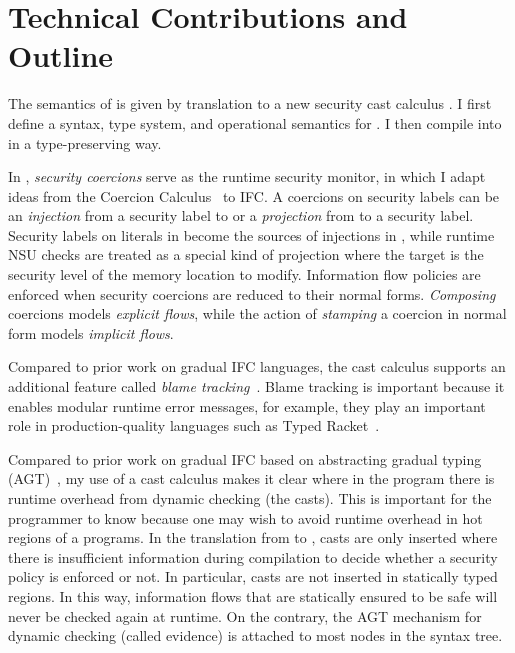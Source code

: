 \section{Technical Contributions and Outline}

The semantics of \Surface is given by translation to a new security cast
calculus \CC. I first define a syntax, type system, and operational semantics
for \CC. I then compile \Surface into \CC in a type-preserving way.

In \CC, \textit{security coercions} serve as the runtime security monitor, in
which I adapt ideas from the Coercion
Calculus~\parencite{Henglein:1994nz,Herman:2010aa} to IFC. A coercions on
security labels can be an \textit{injection} from a security label to \unk or a
\textit{projection} from \unk to a security label. Security labels on literals
in \Surface become the sources of injections in \CC, while runtime NSU checks
are treated as a special kind of projection where the target is the security
level of the memory location to modify. Information flow policies are enforced
when security coercions are reduced to their normal forms. \textit{Composing}
coercions models \textit{explicit flows}, while the action of \textit{stamping}
a coercion in normal form models \textit{implicit flows}.

Compared to prior work on gradual IFC languages, the \CC cast calculus supports
an additional feature called \textit{blame tracking}~\parencite{Findler:2002eu}.
Blame tracking is important because it enables modular runtime error messages,
for example, they play an important role in production-quality languages such as
Typed Racket~\parencite{Tobin-Hochstadt:2008lr,Preston-Tunnell-Wilson:2018aa}.

Compared to prior work on gradual IFC based on abstracting gradual typing
(AGT)~\parencite{Toro:2018aa}, my use of a cast calculus makes it clear where
in the program there is runtime overhead from dynamic checking (the casts). This
is important for the programmer to know because one may wish to avoid runtime
overhead in hot regions of a programs. In the translation from \Surface to \CC,
casts are only inserted where there is insufficient information during
compilation to decide whether a security policy is enforced or not. In
particular, casts are not inserted in statically typed regions. In this way,
information flows that are statically ensured to be safe will never be checked
again at runtime. On the contrary, the AGT mechanism for dynamic checking
(called evidence) is attached to most nodes in the syntax tree.

